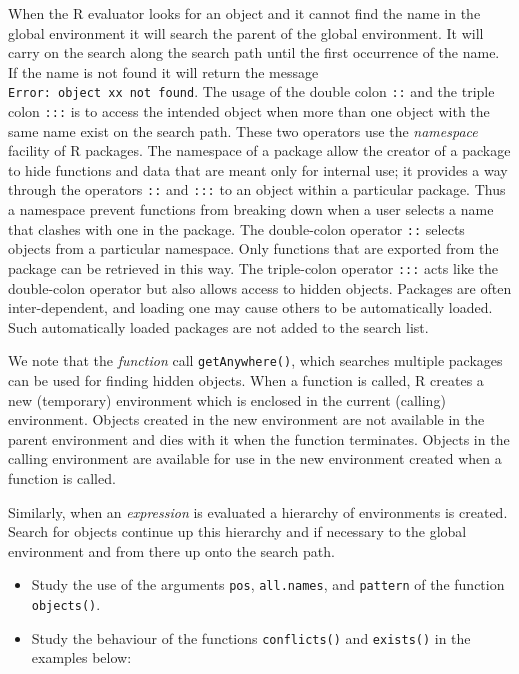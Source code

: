 \documentclass[
]{book}
\providecommand{\tightlist}{%
  \setlength{\itemsep}{0pt}\setlength{\parskip}{0pt}}
\begin{document}
When the R evaluator looks for an object and it cannot find the name in the global environment it will search the parent of the global environment. It will carry on the search along the search path until the first occurrence of the name. If the name is not found it will return the message \texttt{Error:\ object\ \textquotesingle{}xx\textquotesingle{}\ not\ found}. The usage of the double colon \texttt{::} and the triple colon \texttt{:::} is to access the intended object when more than one object with the same name exist on the search path. These two operators use the \emph{{namespace}} facility of R packages. The namespace of a package allow the creator of a package to hide functions and data that are meant only for internal use; it provides a way through the operators \texttt{::} and \texttt{:::} to an object within a particular package. Thus a namespace prevent functions from breaking down when a user selects a name that clashes with one in the package. The double-colon operator \texttt{::} selects objects from a particular namespace. Only functions that are exported from the package can be retrieved in this way. The triple-colon operator \texttt{:::} acts like the double-colon operator but also allows access to hidden objects. Packages are often inter-dependent, and loading one may cause others to be automatically loaded. Such automatically loaded packages are not added to the search list.

We note that the \emph{{function}} call \texttt{getAnywhere()}, which searches multiple packages can be used for finding hidden objects. When a function is called, R creates a new (temporary) environment which is enclosed in the current (calling) environment. Objects created in the new environment are not available in the parent environment and dies with it when the function terminates. Objects in the calling environment are available for use in the new environment created when a function is called.

Similarly, when an \emph{{expression}} is evaluated a hierarchy of environments is created. Search for objects continue up this hierarchy and if necessary to the global environment and from there up onto the search path.

\begin{itemize}
\tightlist
\item
  Study the use of the arguments \texttt{pos}, \texttt{all.names}, and \texttt{pattern} of the function \texttt{objects()}.
\item
  Study the behaviour of the functions \texttt{conflicts()} and \texttt{exists()} in the examples below:
\end{itemize}
\end{document}
